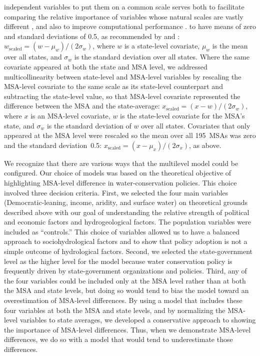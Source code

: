 \documentclass[draft,linenumbers]{agujournal}\usepackage{knitr}
\begin{document}
 independent variables  to put them on a common
scale serves both
to facilitate comparing the relative importance of variables whose natural scales are
vastly different
\citep[pp.~55--57]{gelman:prior:2008,gelman:arm:2007},
and also to improve computational performance \citep{stan:manual:2015}.
 to have means of zero and
standard deviations of 0.5, as recommended by \citet{gelman:prior:2008}
and \citet[pp.~55--57]{gelman:arm:2007}:
$w_{\text{scaled}} = (w - \mu_w) / (2 \sigma_w)$,
where $w$ is a state-level covariate,
$\mu_w$ is the mean over all states,
and $\sigma_w$ is the standard deviation over all states.
Where the same covariate appeared at both the state and
MSA level,
we addressed multicollinearity between state-level and MSA-level
variables by rescaling the MSA-level covariate
to the same scale as its state-level counterpart and
subtracting the state-level value,
so that MSA-level covariate represented the difference between the MSA and
the state-average:
$x_{\text{scaled}} = (x - w) / (2 \sigma_w)$, where $x$ is an MSA-level
covariate, $w$ is the state-level covariate for the MSA's state, and $\sigma_w$
is the standard deviation of $w$ over all states.
Covariates that only appeared at the MSA level were rescaled so
the mean over all 195~MSAs was zero and the standard deviation~0.5:
$x_{\text{scaled}} = (x - \mu_x) / (2 \sigma_x)$, as above.

We recognize that there are various ways that the multilevel model could be
configured.
Our choice of models was based on the theoretical objective of highlighting MSA-level
difference in water-conservation policies. This choice involved three decision criteria.
First, we selected the four main variables (Democratic-leaning, income, aridity, and
surface water) on theoretical grounds described above with our goal of understanding the
relative strength of political and economic factors and hydrogeological factors. The
population variables were included as “controls.” This choice of variables allowed us to
have a balanced approach to sociohydrological factors and to show that policy adoption is
not a simple outcome of hydrological factors. Second, we selected the state-government
level as the higher level for the model because water conservation policy is frequently
driven by state-government organizations and policies. Third, any of the four variables
could be included only at the MSA level rather than at both the MSA and state levels, but
doing so would tend to bias the model toward an overestimation of MSA-level differences.
By using a model that includes these four variables at both the MSA and state levels, and
by normalizing the MSA-level variables to state averages, we developed a conservative
approach to showing the importance of MSA-level differences.
Thus, when we demonstrate MSA-level differences, we do so with a model that would tend
to underestimate those differences.
\end{document}
